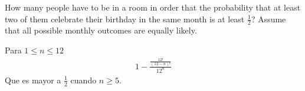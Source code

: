 \item How many people have to be in a room in order that the probability that at least two of them celebrate their birthday in the same month is at least $\tfrac{1}{2}$? Assume that all possible monthly outcomes are equally likely.

Para $1 \le n \le 12$
\begin{align*}
    1 - \frac{\frac{12!}{(12-n)!}}{12^n}
\end{align*}
Que es mayor a $\tfrac{1}{2}$ cuando $n \ge 5$.